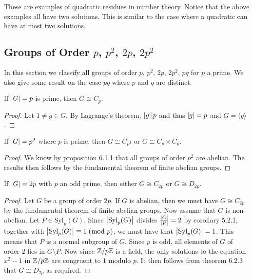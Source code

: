 \documentclass[a4paper]{article}
\begin{document}
These are examples of quadratic residues in number theory. Notice that the above examples all have two solutions. This is similar to the case where a quadratic can have at most two solutions. 

\subsection{Groups of Order $p$, $p^2$, $2p$, $2p^2$}
In this section we classify all groups of order $p$, $p^2$, $2p$, $2p^2$, $pq$ for $p$ a prime. We also give some result on the case $pq$ where $p$ and $q$ are distinct. 

\begin{prp}{}{} If $\abs{G}=p$ is prime, then $G\cong C_p$. 
\begin{proof}
Let $1\neq g\in G$. By Lagrange's theorem, $\abs{g}|p$ and thus $\abs{g}=p$ and $G=\langle g\rangle$. 
\end{proof}
\end{prp}

\begin{prp}{}{} If $\abs{G}=p^2$ where $p$ is prime, then $G\cong C_{p^2}$ or $G\cong C_p\times C_p$. 
\begin{proof}
We know by proposition 6.1.1 that all groups of order $p^2$ are abelian. The results then follows by the fundamental theorem of finite abelian groups. 
\end{proof}
\end{prp}

\begin{prp}{}{} If $\abs{G}=2p$ with $p$ an odd prime, then either $G\cong C_{2p}$ or $G\cong D_{2p}$. 
\begin{proof}
Let $G$ be a group of order $2p$. If $G$ is abelian, then we must have $G\cong C_{2p}$ by the fundamental theorem of finite abelian groups. Now assume that $G$ is non-abelian. Let $P\in\text{Syl}_p(G)$. Since $\abs{\text{Syl}_p(G)}$ divides $\frac{\abs{G}}{\abs{P}}=2$ by corollary 5.2.1, together with $\abs{\text{Syl}_p(G)}\equiv 1\;(\bmod\;p)$, we must have that $\abs{\text{Syl}_p(G)}=1$. This means that $P$ is a normal subgroup of $G$. Since $p$ is odd, all elements of $G$ of order $2$ lies in $G\setminus P$. Now since $\mathbb{Z}/p\mathbb{Z}$ is a field, the only solutions to the equation $x^2-1$ in $\mathbb{Z}/p\mathbb{Z}$ are congruent to $1$ modulo $p$. It then follows from theorem 6.2.3 that $G\cong D_{2p}$ as required. 
\end{proof}
\end{prp}
\end{document}
